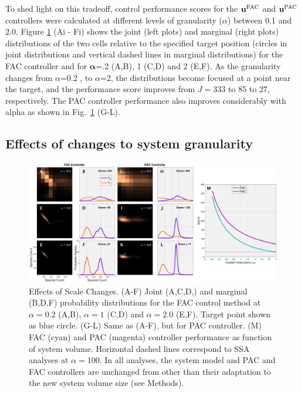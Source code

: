 \documentclass[12pt]{article}
\begin{document}
To shed light on this tradeoff, control performance scores for the $\mathbf{u}^{\rm FAC}$ and $\mathbf{u}^{\rm PAC}$ controllers were calculated at different levels of granularity ($\alpha$) between 0.1 and 2.0. 
Figure \ref{Volume} (Ai - Fi) shows the joint (left plots) and marginal (right plots) distributions of the two cells relative to the specified target position (circles in joint distributions and vertical dashed lines in marginal distributions) for the FAC controller and for $\mathbf{\alpha}$=.2 (A,B), 1 (C,D) and 2 (E,F). As the granularity changes from $\alpha$=0.2 , to $\alpha$=2, the distributions become focused at a point near the target, and the performance score improves from $J=$333 to 85 to 27, respectively. The PAC controller performance also improves considerably with alpha as shown in Fig.\ \ref{Volume} (G-L).
\subsection{Effects of changes to system granularity}
\begin{figure}[t!]
\begin{center}
\includegraphics[width=1\textwidth]{GranularityPerturbation.eps}
\vspace{-0.1in}
\caption{Effects of Scale Changes. (A-F) Joint (A,C,D,) and marginal (B,D,F) probability distributions for the FAC control method at $\alpha=0.2$ (A,B), $\alpha=1$ (C,D) and $\alpha=2.0$ (E,F).  Target point shown as blue circle. (G-L) Same as (A-F), but for PAC controller. (M)  FAC (cyan) and PAC (magenta) controller performance as function of system volume. Horizontal dashed lines correspond to SSA analyses at $\alpha=100$. In all analyses, the system model and PAC and FAC controllers are unchanged from \cite{May2021} other than their adaptation to the new system volume size (see Methods).}
\label{Volume}
\end{center}
\vspace{-0.2in}
\end{figure}
\end{document}
